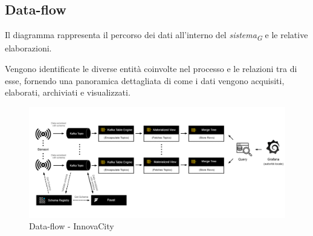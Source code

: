 \subsection{Data-flow}
Il diagramma rappresenta il percorso dei dati all'interno del \textit{sistema}\textsubscript{\textit{G}} e le relative elaborazioni.

Vengono identificate le diverse entità coinvolte nel processo e le relazioni tra di esse, fornendo una panoramica dettagliata di come i dati vengono acquisiti, elaborati, archiviati e visualizzati.

\begin{figure}[H]
    \centering
    \includegraphics[width=1\textwidth]{../Images/SpecificaTecnica/data_flow.jpg}
    \caption{Data-flow - InnovaCity}
    \label{fig: dataflow}
\end{figure}

